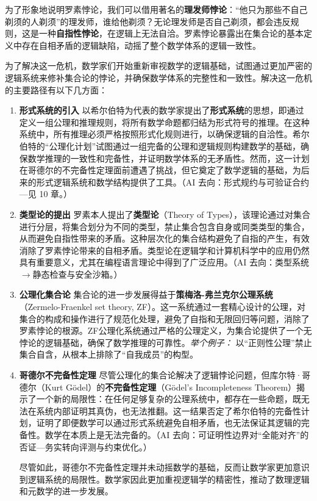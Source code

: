 
为了形象地说明罗素悖论，我们可以借用著名的{\bf 理发师悖论}：“他只为那些不自己剃须的人剃须”的理发师，谁给他剃须？无论理发师是否自己剃须，都会违反规则，这是一种{\bf 自指性悖论}，在逻辑上无法自洽。罗素悖论暴露出在集合论的基本定义中存在自相矛盾的逻辑缺陷，动摇了整个数学体系的逻辑一致性。

为了解决这一危机，数学家们开始重新审视数学的逻辑基础，试图通过更加严密的逻辑系统来修补集合论的悖论，并确保数学体系的完整性和一致性。解决这一危机的主要路径有以下几方面：

\begin{enumerate}
\item {\bf 形式系统的引入}
以希尔伯特为代表的数学家提出了{\bf 形式系统}的思想，即通过定义一组公理和推理规则，将所有数学命题都归结为形式符号的推理。在这种系统中，所有推理必须严格按照形式化规则进行，以确保逻辑的自洽性。希尔伯特的“公理化计划”试图通过一组完备的公理和逻辑规则构建数学的基础，确保数学推理的一致性和完备性，并证明数学体系的无矛盾性。然而，这一计划在哥德尔的不完备性定理面前遭遇了挑战，但它奠定了数学逻辑的基础，为后来的形式逻辑系统和数学结构提供了工具。{（AI 去向：形式规约与可验证合约—见 10 章。）}

\item {\bf 类型论的提出}
罗素本人提出了{\bf 类型论}（Theory of Types），该理论通过对集合进行分层，将集合划分为不同的类型，禁止集合包含自身或同类类型的集合，从而避免自指性带来的矛盾。这种层次化的集合结构避免了自指的产生，有效消除了罗素悖论带来的自相矛盾。类型论在逻辑学和计算机科学中的应用仍然具有重要意义，尤其在编程语言理论中得到了广泛应用。{（AI 去向：类型系统$\rightarrow$静态检查与安全沙箱。）}

\item {\bf 公理化集合论}
集合论的进一步发展得益于{\bf 策梅洛-弗兰克尔公理系统}（Zermelo-Fraenkel set theory, ZF）。这一系统通过一套精心设计的公理，对集合的构成和操作进行了规范化处理，避免了自指和无限回归等问题，消除了罗素悖论的根源。ZF公理化系统通过严格的公理定义，为集合论提供了一个无悖论的逻辑基础，确保了数学推理的可靠性。{{\itshape 举个例子：} 以“正则性公理”禁止集合自含，从根本上排除了“自我成员”的构型。}

\item {\bf 哥德尔不完备性定理}
尽管公理化的集合论解决了逻辑悖论问题，但库尔特·哥德尔（Kurt Gödel）的{\bf 不完备性定理}（Gödel's Incompleteness Theorem）揭示了一个新的局限性：在任何足够复杂的公理系统中，都存在一些命题，既无法在系统内部证明其真伪，也无法推翻。这一结果否定了希尔伯特的完备性计划，证明了即便数学可以通过形式系统避免自相矛盾，也无法保证其逻辑的完备性。数学在本质上是无法完备的。{（AI 去向：可证明性边界对“全能对齐”的否证—务实转向评测与约束优化。）}

尽管如此，哥德尔不完备性定理并未动摇数学的基础，反而让数学家更加意识到逻辑系统的局限性。数学家因此更加重视逻辑学的精密性，推动了数理逻辑和元数学的进一步发展。
\end{enumerate}


